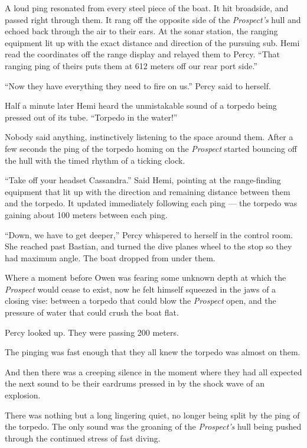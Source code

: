 \documentclass[
]{scrbook}
\begin{document}
A loud ping resonated from every steel piece of the boat. It hit
broadside, and passed right through them. It rang off the opposite side
of the \emph{Prospect's} hull and echoed back through the air to their
ears. At the sonar station, the ranging equipment lit up with the exact
distance and direction of the pursuing sub. Hemi read the coordinates
off the range display and relayed them to Percy. ``That ranging ping of
theirs puts them at 612 meters off our rear port side.''

``Now they have everything they need to fire on us.'' Percy said to
herself.

Half a minute later Hemi heard the unmistakable sound of a torpedo being
pressed out of its tube. ``Torpedo in the water!''

Nobody said anything, instinctively listening to the space around them.
After a few seconds the ping of the torpedo homing on the
\emph{Prospect} started bouncing off the hull with the timed rhythm of a
ticking clock.

``Take off your headset Cassandra.'' Said Hemi, pointing at the
range-finding equipment that lit up with the direction and remaining
distance between them and the torpedo. It updated immediately following
each ping --- the torpedo was gaining about 100 meters between each
ping.

``Down, we have to get deeper,'' Percy whispered to herself in the
control room. She reached past Bastian, and turned the dive planes wheel
to the stop so they had maximum angle. The boat dropped from under them.

Where a moment before Owen was fearing some unknown depth at which the
\emph{Prospect} would cease to exist, now he felt himself squeezed in
the jaws of a closing vise: between a torpedo that could blow the
\emph{Prospect} open, and the pressure of water that could crush the
boat flat.

Percy looked up. They were passing 200 meters.

The pinging was fast enough that they all knew the torpedo was almost on
them.

And then there was a creeping silence in the moment where they had all
expected the next sound to be their eardrums pressed in by the shock
wave of an explosion.

There was nothing but a long lingering quiet, no longer being split by
the ping of the torpedo. The only sound was the groaning of the
\emph{Prospect's} hull being pushed through the continued stress of fast
diving.
\end{document}
